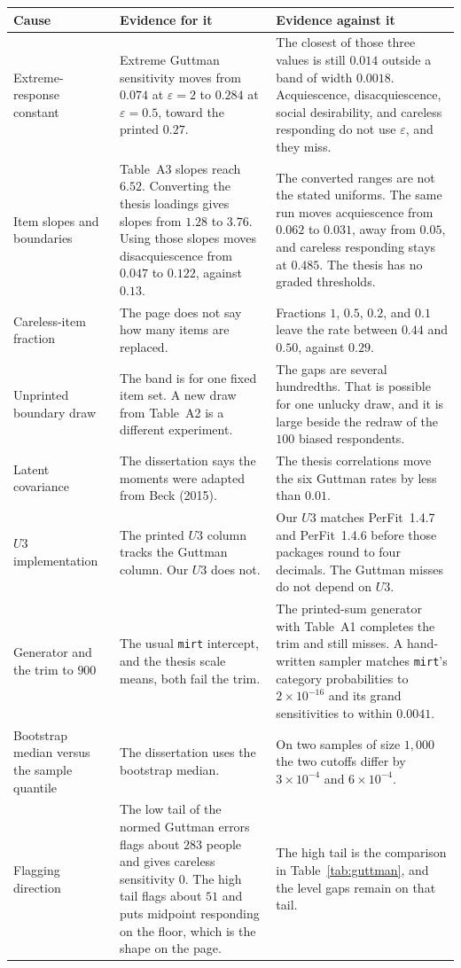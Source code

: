 \documentclass[11pt]{article}
\renewcommand{\arraystretch}{1.3}
\begin{document}
\begin{center}
\small
\renewcommand{\arraystretch}{1.3}
\begin{tabular}{@{}p{}p{}p{}@{}}
\toprule
Cause & Evidence for it & Evidence against it \\
\midrule
Extreme-response constant &
Extreme Guttman sensitivity moves from \(0.074\) at \(\varepsilon=2\) to \(0.284\) at \(\varepsilon=0.5\), toward the printed \(0.27\). &
The closest of those three values is still \(0.014\) outside a band of width \(0.0018\). Acquiescence, disacquiescence, social desirability, and careless responding do not use \(\varepsilon\), and they miss. \\
Item slopes and boundaries &
Table~A3 slopes reach \(6.52\). Converting the thesis loadings gives slopes from \(1.28\) to \(3.76\). Using those slopes moves disacquiescence from \(0.047\) to \(0.122\), against \(0.13\). &
The converted ranges are not the stated uniforms. The same run moves acquiescence from \(0.062\) to \(0.031\), away from \(0.05\), and careless responding stays at \(0.485\). The thesis has no graded thresholds. \\
Careless-item fraction &
The page does not say how many items are replaced. &
Fractions \(1\), \(0.5\), \(0.2\), and \(0.1\) leave the rate between \(0.44\) and \(0.50\), against \(0.29\). \\
Unprinted boundary draw &
The band is for one fixed item set. A new draw from Table~A2 is a different experiment. &
The gaps are several hundredths. That is possible for one unlucky draw, and it is large beside the redraw of the \(100\) biased respondents. \\
Latent covariance &
The dissertation says the moments were adapted from Beck (2015). &
The thesis correlations move the six Guttman rates by less than \(0.01\). \\
\(U3\) implementation &
The printed \(U3\) column tracks the Guttman column. Our \(U3\) does not. &
Our \(U3\) matches PerFit~1.4.7 and PerFit~1.4.6 before those packages round to four decimals. The Guttman misses do not depend on \(U3\). \\
Generator and the trim to \(900\) &
The usual \texttt{mirt} intercept, and the thesis scale means, both fail the trim. &
The printed-sum generator with Table~A1 completes the trim and still misses. A hand-written sampler matches \texttt{mirt}'s category probabilities to \(2\times 10^{-16}\) and its grand sensitivities to within \(0.0041\). \\
Bootstrap median versus the sample quantile &
The dissertation uses the bootstrap median. &
On two samples of size \(1{,}000\) the two cutoffs differ by \(3\times 10^{-4}\) and \(6\times 10^{-4}\). \\
Flagging direction &
The low tail of the normed Guttman errors flags about \(283\) people and gives careless sensitivity \(0\). The high tail flags about \(51\) and puts midpoint responding on the floor, which is the shape on the page. &
The high tail is the comparison in Table~\ref{tab:guttman}, and the level gaps remain on that tail. \\
\bottomrule
\end{tabular}
\end{center}
\end{document}
